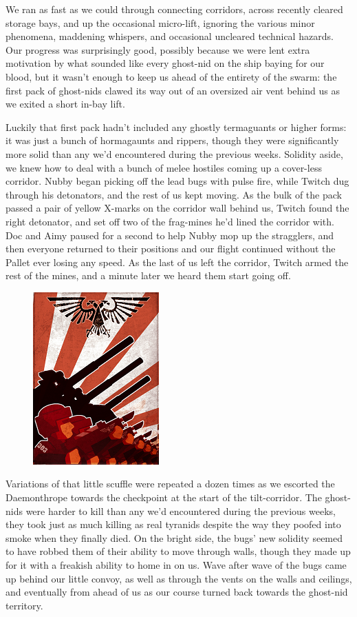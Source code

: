 We ran as fast as we could through connecting corridors, across recently cleared storage bays, and up the occasional micro-lift, ignoring the various minor phenomena, maddening whispers, and occasional uncleared technical hazards. 
Our progress was surprisingly good, possibly because we were lent extra motivation by what sounded like every ghost-nid on the ship baying for our blood, but it wasn't enough to keep us ahead of the entirety of the swarm: 
the first pack of ghost-nids clawed its way out of an oversized air vent behind us as we exited a short in-bay lift.

Luckily that first pack hadn't included any ghostly termaguants or higher forms: 
it was just a bunch of hormagaunts and rippers, though they were significantly more solid than any we'd encountered during the previous weeks. 
Solidity aside, we knew how to deal with a bunch of melee hostiles coming up a cover-less corridor. 
Nubby began picking off the lead bugs with pulse fire, while Twitch dug through his detonators, and the rest of us kept moving. 
As the bulk of the pack passed a pair of yellow X-marks on the corridor wall behind us, Twitch found the right detonator, and set off two of the frag-mines he'd lined the corridor with. 
Doc and Aimy paused for a second to help Nubby mop up the stragglers, and then everyone returned to their positions and our flight continued without the Pallet ever losing any speed. 
As the last of us left the corridor, Twitch armed the rest of the mines, and a minute later we heard them start going off.

\begin{figure}
	\begin{center}
		\includegraphics[width=\figwidth]{pics/15/50.png}
	\end{center}
\end{figure}
Variations of that little scuffle were repeated a dozen times as we escorted the Daemonthrope towards the checkpoint at the start of the tilt-corridor. 
The ghost-nids were harder to kill than any we'd encountered during the previous weeks, they took just as much killing as real tyranids despite the way they poofed into smoke when they finally died. 
On the bright side, the bugs' new solidity seemed to have robbed them of their ability to move through walls, though they made up for it with a freakish ability to home in on us. 
Wave after wave of the bugs came up behind our little convoy, as well as through the vents on the walls and ceilings, and eventually from ahead of us as our course turned back towards the ghost-nid territory. 


